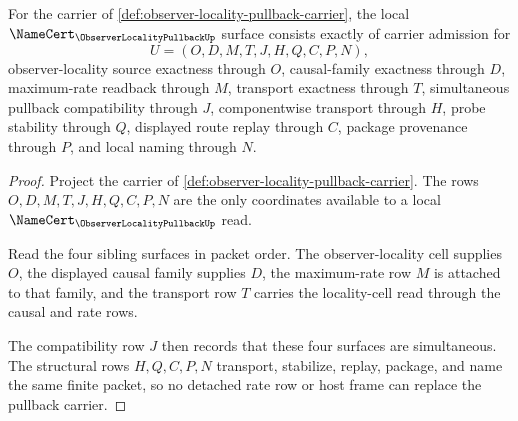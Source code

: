 \begin{theorem}
\label{thm:observer-locality-pullback-namecert-obligations}
For the carrier of \autoref{def:observer-locality-pullback-carrier}, the local $\NameCert_{\ObserverLocalityPullbackUp}$ surface consists exactly of carrier admission for
$$
U=(O,D,M,T,J,H,Q,C,P,N),
$$
observer-locality source exactness through $O$, causal-family exactness through $D$, maximum-rate readback through $M$, transport exactness through $T$, simultaneous pullback compatibility through $J$, componentwise transport through $H$, probe stability through $Q$, displayed route replay through $C$, package provenance through $P$, and local naming through $N$.
\end{theorem}
\begin{proof}
Project the carrier of \autoref{def:observer-locality-pullback-carrier}. The rows $O,D,M,T,J,H,Q,C,P,N$ are the only coordinates available to a local $\NameCert_{\ObserverLocalityPullbackUp}$ read.

Read the four sibling surfaces in packet order. The observer-locality cell supplies $O$, the displayed causal family supplies $D$, the maximum-rate row $M$ is attached to that family, and the transport row $T$ carries the locality-cell read through the causal and rate rows.

The compatibility row $J$ then records that these four surfaces are simultaneous. The structural rows $H,Q,C,P,N$ transport, stabilize, replay, package, and name the same finite packet, so no detached rate row or host frame can replace the pullback carrier.
\end{proof}

